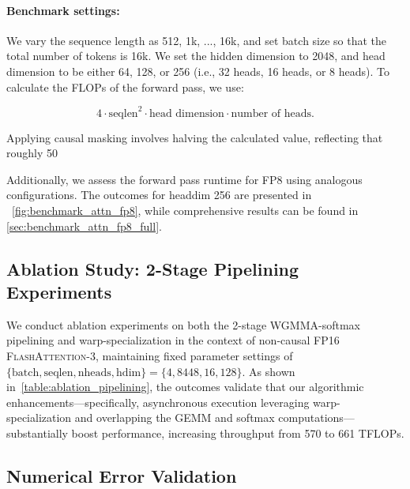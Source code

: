 \begin{itemize}
\paragraph{Benchmark settings:} We vary the sequence length as 512, 1k, ..., 16k, and set batch size so that the total number of tokens is 16k. We set the hidden dimension to 2048, and head dimension to be either 64, 128, or 256 (i.e., 32 heads, 16 heads, or 8 heads). To calculate the FLOPs of the forward pass, we use:

\begin{equation*}
  4 \cdot \text{seqlen}^2 \cdot \text{head dimension} \cdot \text{number of heads}.
\end{equation*}

Applying causal masking involves halving the calculated value, reflecting that roughly 50%

Additionally, we assess the forward pass runtime for FP8 using analogous configurations. The outcomes for headdim 256 are presented in ~\cref{fig:benchmark_attn_fp8}, while comprehensive results can be found in \cref{sec:benchmark_attn_fp8_full}.

\subsection{Ablation Study: 2-Stage Pipelining Experiments}
\label{sec:2-stage-pipelining-experiments}

We conduct ablation experiments on both the 2-stage WGMMA-softmax pipelining and warp-specialization in the context of non-causal FP16 \textsc{FlashAttention-3}, maintaining fixed parameter settings of $\{\text{batch}, \text{seqlen}, \text{nheads}, \text{hdim}\} = \{ 4, 8448, 16, 128\}$. As shown in~\cref{table:ablation_pipelining}, the outcomes validate that our algorithmic enhancements—specifically, asynchronous execution leveraging warp-specialization and overlapping the GEMM and softmax computations—substantially boost performance, increasing throughput from 570 to 661 TFLOPs.

\subsection{Numerical Error Validation}
\label{sec:numerical_error}


\end{itemize}
